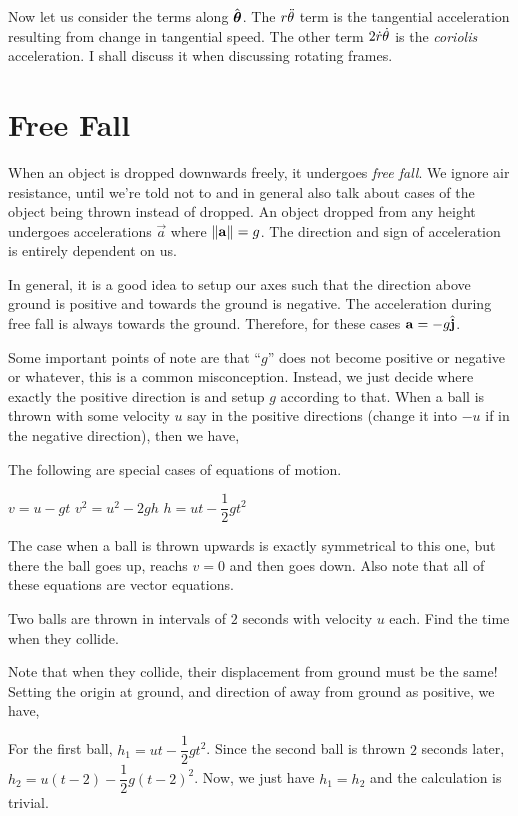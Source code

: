 Now let us consider the terms along \({\hat{\boldsymbol{\mathbf{\theta}}}}\). The \(r\ddot{\theta}\) term is the tangential
acceleration resulting from change in tangential speed. The other term \(2\dot{r}\dot{\theta}\) is the
\emph{coriolis} acceleration. I shall discuss it when discussing rotating frames.

\section{Free Fall}

When an object is dropped downwards freely, it undergoes \emph{free fall}. We ignore
air resistance, until we're told not to and in general also talk about cases of the
object being thrown instead of dropped. An object dropped from any height undergoes
accelerations \(\vec{a}\) where \(\norm{\boldsymbol{\mathbf{a}}} = g\). The direction and sign of acceleration
is entirely dependent on us.

In general, it is a good idea to setup our axes such that the direction above ground is positive
and towards the ground is negative. The acceleration during free fall is always towards
the ground. Therefore, for these cases \(\boldsymbol{\mathbf{a}} = -g {\hat{\boldsymbol{\mathbf{j}}}}\). 

Some important points of note are that ``\(g\)'' does not become positive or negative or whatever,
this is a common misconception. Instead, we just decide where exactly the positive direction is
and setup \(g\) according to that.
\parbreak
When a ball is thrown with some velocity \(u\) say in the positive directions
(change it into \(-u\) if in the negative direction), then we have,

\begin{algorithm}
    The following are special cases of equations of motion.
    \begin{enumerate}
        \ii \(v = u - gt\)
        \ii \(v^2 = u^2 -2gh\)
        \ii \(h = ut - \dfrac{1}{2}gt^2\)
    \end{enumerate} 
\end{algorithm}

The case when a ball is thrown upwards is exactly symmetrical to this one, but there
the ball goes up, reachs \(v = 0\) and then goes down. Also note that all of these equations are vector
equations.

\begin{example}
    Two balls are thrown in intervals of \(2\) seconds with velocity \(u\) each. Find the
    time when they collide.

    \begin{soln}
        Note that when they collide, their displacement from ground must be the same! Setting 
        the origin at ground, and direction of away from ground as positive, we have,
        
        For the first ball, \(h_{1} = ut - \dfrac{1}{2}gt^2\). Since the second ball
        is thrown \(2\) seconds later, \(h_{2} = u(t-2) - \dfrac{1}{2}g(t-2)^2\). Now, we just have
        \(h_{1} = h_{2}\) and the calculation is trivial.
    \end{soln}
\end{example}

